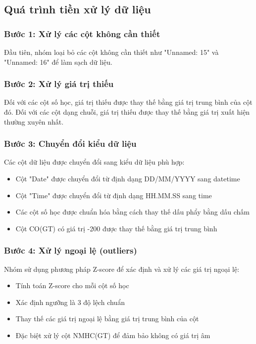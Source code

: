 \subsection{Quá trình tiền xử lý dữ liệu}

\subsubsection{Bước 1: Xử lý các cột không cần thiết}
\hspace{0.5cm}Đầu tiên, nhóm loại bỏ các cột không cần thiết như "Unnamed: 15" và "Unnamed: 16" để làm sạch dữ liệu.

\subsubsection{Bước 2: Xử lý giá trị thiếu}
\hspace{0.5cm}Đối với các cột số học, giá trị thiếu được thay thế bằng giá trị trung bình của cột đó. Đối với các cột dạng chuỗi, giá trị thiếu được thay thế bằng giá trị xuất hiện thường xuyên nhất.

\subsubsection{Bước 3: Chuyển đổi kiểu dữ liệu}
\hspace{0.5cm}Các cột dữ liệu được chuyển đổi sang kiểu dữ liệu phù hợp:
\begin{itemize}
    \item Cột "Date" được chuyển đổi từ định dạng DD/MM/YYYY sang datetime
    \item Cột "Time" được chuyển đổi từ định dạng HH.MM.SS sang time
    \item Các cột số học được chuẩn hóa bằng cách thay thế dấu phẩy bằng dấu chấm
    \item Cột CO(GT) có giá trị -200 được thay thế bằng giá trị trung bình
\end{itemize}

\subsubsection{Bước 4: Xử lý ngoại lệ (outliers)}
\hspace{0.5cm}Nhóm sử dụng phương pháp Z-score để xác định và xử lý các giá trị ngoại lệ:
\begin{itemize}
    \item Tính toán Z-score cho mỗi cột số học
    \item Xác định ngưỡng là 3 độ lệch chuẩn
    \item Thay thế các giá trị ngoại lệ bằng giá trị trung bình của cột
    \item Đặc biệt xử lý cột NMHC(GT) để đảm bảo không có giá trị âm
\end{itemize}

